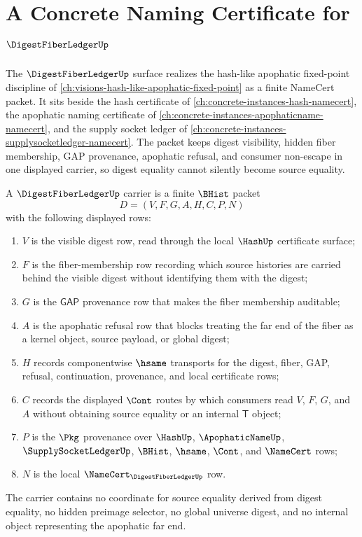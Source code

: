 \chapter{A Concrete Naming Certificate for $\DigestFiberLedgerUp$}
\label{ch:concrete-instances-digestfiberledger-namecert}

The $\DigestFiberLedgerUp$ surface realizes the hash-like apophatic fixed-point discipline of \autoref{ch:visions-hash-like-apophatic-fixed-point} as a finite NameCert packet. It sits beside the hash certificate of \autoref{ch:concrete-instances-hash-namecert}, the apophatic naming certificate of \autoref{ch:concrete-instances-apophaticname-namecert}, and the supply socket ledger of \autoref{ch:concrete-instances-supplysocketledger-namecert}. The packet keeps digest visibility, hidden fiber membership, GAP provenance, apophatic refusal, and consumer non-escape in one displayed carrier, so digest equality cannot silently become source equality.

\begin{definition}
\label{def:digest-fiber-ledger-carrier}
A $\DigestFiberLedgerUp$ carrier is a finite $\BHist$ packet
$$
D=(V,F,G,A,H,C,P,N)
$$
with the following displayed rows:
\begin{enumerate}
\item $V$ is the visible digest row, read through the local $\HashUp$ certificate surface;
\item $F$ is the fiber-membership row recording which source histories are carried behind the visible digest without identifying them with the digest;
\item $G$ is the $\mathsf{GAP}$ provenance row that makes the fiber membership auditable;
\item $A$ is the apophatic refusal row that blocks treating the far end of the fiber as a kernel object, source payload, or global digest;
\item $H$ records componentwise $\hsame$ transports for the digest, fiber, GAP, refusal, continuation, provenance, and local certificate rows;
\item $C$ records the displayed $\Cont$ routes by which consumers read $V$, $F$, $G$, and $A$ without obtaining source equality or an internal $\mathsf{T}$ object;
\item $P$ is the $\Pkg$ provenance over $\HashUp$, $\ApophaticNameUp$, $\SupplySocketLedgerUp$, $\BHist$, $\hsame$, $\Cont$, and $\NameCert$ rows;
\item $N$ is the local $\NameCert_{\DigestFiberLedgerUp}$ row.
\end{enumerate}
The carrier contains no coordinate for source equality derived from digest equality, no hidden preimage selector, no global universe digest, and no internal object representing the apophatic far end.
\end{definition}

